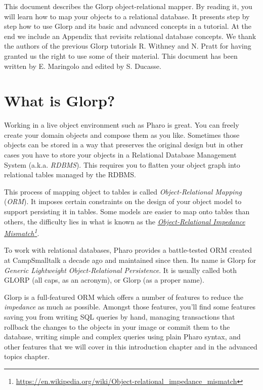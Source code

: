 \documentclass[10pt,twoside,english]{_support/latex/sbabook/sbabook}
\begin{document}
\frontmatter
\pagestyle{plain}

\tableofcontents*
\clearpage\listoffigures

\mainmatter


This document describes the Glorp object-relational mapper. By reading it, you will learn how to map your objects to a relational database. It presents step by step how to use Glorp and its basic and advanced concepts in a tutorial. At the end we include an Appendix that revisits relational database concepts.
We thank the authors of the previous Glorp tutorials R. Withney and N. Pratt for having granted us the right to use some of their material. This document has been written by E. Maringolo and edited by S. Ducasse.
\chapter{What is Glorp?}
Working in a live object environment such as Pharo is great. You can freely create your domain objects and compose them as you like. Sometimes those objects can be stored in a way that preserves the original design but in other cases you have to store your objects in a Relational Database Management System (a.k.a. \textit{RDBMS}). This requires you to flatten your object graph into relational tables managed by the RDBMS.

This process of mapping object to tables is called \textit{Object-Relational Mapping} (\textit{ORM}). It imposes certain constraints on the design of your object model to support persisting it in tables. Some models are easier to map onto tables than others, the difficulty lies in what is known as the \textit{\href{https://en.wikipedia.org/wiki/Object-relational_impedance_mismatch}{Object-Relational Impedance Mismatch}\footnote{\url{https://en.wikipedia.org/wiki/Object-relational_impedance_mismatch}}}.

To work with relational databases, Pharo provides a battle-tested ORM created at CampSmalltalk a decade ago and maintained since then. Its name is Glorp for \textit{Generic Lightweight Object-Relational Persistence}. It is usually called both GLORP (all caps, as an acronym), or Glorp (as a proper name).

Glorp is a full-featured ORM which offers a number of features to reduce the \textit{impedance} as much as possible. Amongst those features, you'll find some features saving you from writing SQL queries by hand, managing transactions that rollback the changes to the objects in your image or commit them to the database, writing simple and complex queries using plain Pharo syntax, and other features that we will cover in this introduction chapter and in the advanced topics chapter.
\end{document}
